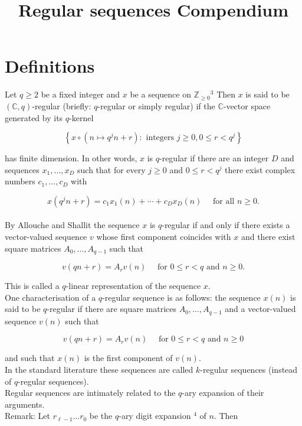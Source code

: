 
\title{Regular sequences Compendium}



\section{Definitions}
Let $q \geq 2$ be a fixed integer and $x$ be a sequence on $\mathbb{Z}_{\geq 0}{ }^{3}$ Then $x$ is said to be $(\mathbb{C}, q)$-regular (briefly: $q$-regular or simply regular) if the $\mathbb{C}$-vector space generated by its $q$-kernel

$$
\left\{x \circ\left(n \mapsto q^{j} n+r\right): \text { integers } j \geq 0,0 \leq r<q^{j}\right\}
$$

has finite dimension. In other words, $x$ is $q$-regular if there are an integer $D$ and sequences $x_{1}, \ldots, x_{D}$ such that for every $j \geq 0$ and $0 \leq r<q^{j}$ there exist complex numbers $c_{1}, \ldots, c_{D}$ with

$$
x\left(q^{j} n+r\right)=c_{1} x_{1}(n)+\cdots+c_{D} x_{D}(n) \quad \text { for all } n \geq 0 .
$$
\\

By Allouche and Shallit the sequence $x$ is $q$-regular if and only if there exists a vector-valued sequence $v$ whose first component coincides with $x$ and there exist square matrices $A_{0}, \ldots, A_{q-1}$ such that

$$
v(q n+r)=A_{r} v(n) \quad \text { for } 0 \leq r<q \text { and } n \geq 0 .
$$

This is called a $q$-linear representation of the sequence $x$.
\\

One characterisation of a $q$-regular sequence is as follows: the sequence $x(n)$ is said to be $q$-regular if there are square matrices $A_{0}, \ldots, A_{q-1}$ and a vector-valued sequence $v(n)$ such that

$$
v(q n+r)=A_{r} v(n) \quad \text { for } 0 \leq r<q \text { and } n \geq 0
$$

and such that $x(n)$ is the first component of $v(n)$.
\\

In the standard literature these sequences are called $k$-regular sequences (instead of $q$-regular sequences).
\\

Regular sequences are intimately related to the $q$-ary expansion of their arguments.
\\

Remark: Let $r_{\ell-1} \ldots r_{0}$ be the $q$-ary digit expansion ${ }^{4}$ of $n$. Then

